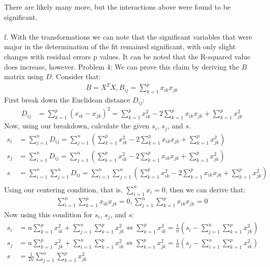 \documentclass[12pt]{article}
\begin{document}
There are likely many more, but the interactions above were found to be significant.
\\ \\ 
f. With the transformations we can note that the significant variables that were major in the determination of the fit remained significant, with only slight changes with residual errors p values. It can be noted that the R-squared value does increase, however.
\newpage
Problem 4:
We can prove this claim by deriving the $B$ matrix using $D$. Consider that:
\begin{align} \nonumber
B = X^TX, B_{ij} = \sum_{k=1}^p x_{ik}x_{jk}
\end{align}
First break down the Euclidean distance $D_{ij}$:
\begin{align} \nonumber
D_{ij} &= \sum_{k=1}^p(x_{ik} - x_{jk})^2 = \sum_{k=1}^px_{ik}^2 - 2\sum_{k=1}^p x_{ik}x_{jk} + \sum_{k=1}^p x_{jk}^2
\end{align}
Now, using our breakdown, calculate the given $s_i$, $s_j$, and $s$.
\begin{align} \nonumber
s_i &= \sum_{j=1}^n D_{ij} = \sum_{j=1}^n( \sum_{k=1}^px_{ik}^2 - 2\sum_{k=1}^p x_{ik}x_{jk} + \sum_{k=1}^p x_{jk}^2)\\ \nonumber
s_j &= \sum_{i=1}^n D_{ij} = \sum_{j=1}^n( \sum_{k=1}^px_{ik}^2 - 2\sum_{k=1}^p x_{ik}x_{jk} + \sum_{k=1}^p x_{jk}^2)\\ \nonumber
s &= \sum_{i=1}^n\sum_{j=1}^n D_{ij} = \sum_{i=1}^n\sum_{j=1}^n( \sum_{k=1}^px_{ik}^2 - 2\sum_{k=1}^p x_{ik}x_{jk} + \sum_{k=1}^p x_{jk}^2)\\ \nonumber
\end{align}
Using our centering condition, that is, $\sum_{i=1}^nx_i = 0$, then we can derive that:
\begin{align}\nonumber
\sum_{i=1}^n\sum_{k=1}^px_{ik}x_{jk} = 0, \sum_{j=1}^n\sum_{k=1}^px_{ik}x_{jk} = 0
\end{align}
Now using this condition for $s_i$, $s_j$, and $s$:
\begin{align}\nonumber
s_i &= n\sum_{k=1}^p x_{ik}^2 + \sum_{j=1}^n\sum_{k=1}^p x_{jk}^2 \Leftrightarrow \sum_{k=1}^p x_{ik}^2 = \frac{1}{n}(s_i - \sum_{j=1}^n\sum_{k=1}^p x_{jk}^2)\\ \nonumber
s_j &= n\sum_{k=1}^p x_{jk}^2 + \sum_{i=1}^n\sum_{k=1}^p x_{ik}^2 \Leftrightarrow \sum_{k=1}^p x_{jk}^2 = \frac{1}{n}(s_j - \sum_{i=1}^n\sum_{k=1}^p x_{ik}^2)\\ \nonumber
s &=  \frac{1}{2n}\sum_{j=1}^n\sum_{k=1}^px_{jk}^2 \\ \nonumber
\end{align}
\end{document}
